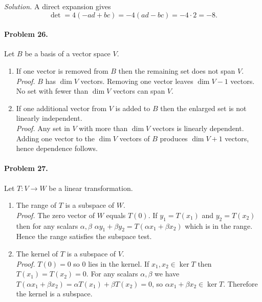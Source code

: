 \documentclass{article}
\begin{document}
\begin{multicols*}{2}
\textit{Solution.}  
A direct expansion gives  
\[
\det = 4(-ad+bc)= -4(ad-bc)= -4\cdot 2 = -8.
\]

\paragraph{Problem 26.}
Let $B$ be a basis of a vector space $V$.

\begin{enumerate}[label=(\alph*)]
\item If one vector is removed from $B$ then the remaining set does not span $V$.\\[2pt]
\textit{Proof.}  
$B$ has $\dim V$ vectors.  
Removing one vector leaves $\dim V -1$ vectors.  
No set with fewer than $\dim V$ vectors can span $V$.

\item If one additional vector from $V$ is added to $B$ then the enlarged set is not linearly independent.\\[2pt]
\textit{Proof.}  
Any set in $V$ with more than $\dim V$ vectors is linearly dependent.  
Adding one vector to the $\dim V$ vectors of $B$ produces $\dim V+1$ vectors, hence dependence follows.
\end{enumerate}

\paragraph{Problem 27.}
Let $T:V\to W$ be a linear transformation.

\begin{enumerate}[label=(\alph*)]
\item The range of $T$ is a subspace of $W$.\\[2pt]
\textit{Proof.}  
The zero vector of $W$ equals $T(0)$.  
If $y_{1}=T(x_{1})$ and $y_{2}=T(x_{2})$ then for any scalars $\alpha,\beta$  
$\alpha y_{1}+\beta y_{2}=T(\alpha x_{1}+\beta x_{2})$ which is in the range.  
Hence the range satisfies the subspace test.

\item The kernel of $T$ is a subspace of $V$.\\[2pt]
\textit{Proof.}  
$T(0)=0$ so $0$ lies in the kernel.  
If $x_{1},x_{2}\in\ker T$ then $T(x_{1})=T(x_{2})=0$.  
For any scalars $\alpha,\beta$ we have  
$T(\alpha x_{1}+\beta x_{2})=\alpha T(x_{1})+\beta T(x_{2})=0$,  
so $\alpha x_{1}+\beta x_{2}\in\ker T$.  
Therefore the kernel is a subspace.
\end{enumerate}


\end{multicols*}
\end{document}

